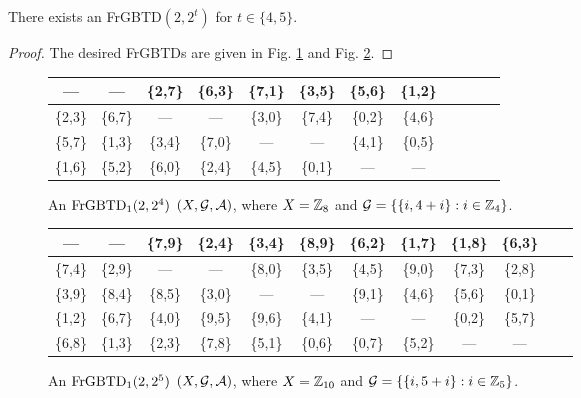 \documentclass[draft, 11pt]{article}
\begin{document}
 \begin{lemma}
 \label{lem:small-fgbtd-2} There exists an FrGBTD$(2,2^t)$ for
 $t\in \{4,5\}$.
 \end{lemma}
 \begin{proof}
 The desired FrGBTDs are given in Fig. \ref{fig:fgbtd2^4} and Fig. \ref{fig:fgbtd2^5}.
 \end{proof}
 \begin{figure}[t!]
 \renewcommand{\arraystretch}{1}
 \small \centering
 \begin{tabular}{|@{ }c@{ }|@{ }c@{ }|@{ }c@{ }|@{ }c@{ }|@{ }c@{ }|@{ }c@{ }|@{ }c@{ }|@{ }c@{ }|@{ }c@{ }|@{ }c@{ }|
 @{ }c@{ }|@{ }c@{ }|}\hline
 ---      &---     &\{2,7\}&\{6,3\}  &\{7,1\} &\{3,5\} &\{5,6\} &\{1,2\}\\ \hline
 \{2,3\} &\{6,7\} &--- &---           &\{3,0\} &\{7,4\} &\{0,2\} &\{4,6\}\\ \hline
 \{5,7\} &\{1,3\} &\{3,4\} &\{7,0\} &--- &---           &\{4,1\} &\{0,5\}\\ \hline
 \{1,6\} &\{5,2\} &\{6,0\} &\{2,4\} &\{4,5\} &\{0,1\} &--- &---           \\ \hline
 \end{tabular}
 \caption{An ${\rm FrGBTD}_1(2,2^4)$ $(X,\mathcal G,\mathcal A)$, where $X=\mathbb Z_{8}$
 and $\mathcal G= \{ \{i,4+i\}: i\in\mathbb Z_4\}$. } \label{fig:fgbtd2^4}
 \end{figure}

 \begin{figure}[t!]
 \renewcommand{\arraystretch}{1}
 \small \centering
 \begin{tabular}{|@{ }c@{ }|@{ }c@{ }|@{ }c@{ }|@{ }c@{ }|@{ }c@{ }|@{ }c@{ }|@{ }c@{ }|@{ }c@{ }|@{ }c@{ }|@{ }c@{ }|
 @{ }c@{ }|@{ }c@{ }|}\hline
 ---      &---    &\{7,9\}&\{2,4\}  &\{3,4\} &\{8,9\} &\{6,2\} &\{1,7\}&\{1,8\} &\{6,3\}\\ \hline
 \{7,4\} &\{2,9\} &---      &---    &\{8,0\} &\{3,5\} &\{4,5\} &\{9,0\}&\{7,3\} &\{2,8\}\\ \hline
 \{3,9\} &\{8,4\} &\{8,5\} &\{3,0\} &---      &---    &\{9,1\} &\{4,6\}&\{5,6\} &\{0,1\}\\ \hline
 \{1,2\} &\{6,7\} &\{4,0\} &\{9,5\} &\{9,6\} &\{4,1\} &---      &---   &\{0,2\} &\{5,7\}   \\ \hline
 \{6,8\} &\{1,3\} &\{2,3\} &\{7,8\} &\{5,1\} &\{0,6\} &\{0,7\} &\{5,2\}&---      &---      \\ \hline
 \end{tabular}
 \caption{An ${\rm FrGBTD}_1(2,2^5)$ $(X,\mathcal G,\mathcal A)$, where $X=\mathbb Z_{10}$
 and $\mathcal G= \{ \{i,5+i\}: i\in\mathbb Z_5\}$. } \label{fig:fgbtd2^5}
 \end{figure}
\end{document}
